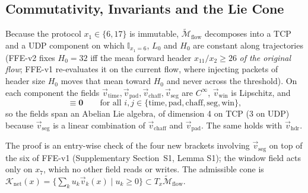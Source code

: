 \subsection{Commutativity, Invariants and the Lie Cone}
\label{sec:invariants}

\begin{proposition}
\label{prop:lie_commutativity}
Because the protocol $x_1\in\{6,17\}$ is immutable, $\widetilde{\mathcal{M}}_{\text{flow}}$ decomposes into a TCP and a UDP component on which $\mathbb{I}_{x_1=6}$, $L_0$ and $H_0$ are constant along trajectories (FFE-v2 fixes $H_0=32$ iff the mean forward header $x_{11}/x_2\ge26$ \emph{of the original flow}; FFE-v1 re-evaluates it on the current flow, where injecting packets of header size $H_0$ moves that mean toward $H_0$ and never across the threshold). On each component the fields $\vec v_{\text{time}},\vec v_{\text{pad}},\vec v_{\text{chaff}},\vec v_{\text{seg}}$ are $C^\infty$, $\vec v_{\text{win}}$ is Lipschitz, and
\begin{equation}
    [\vec v_i,\vec v_j]\equiv\mathbf{0}\qquad\text{for all }i,j\in\{\text{time},\text{pad},\text{chaff},\text{seg},\text{win}\},
\end{equation}
so the fields span an Abelian Lie algebra, of dimension 4 on TCP (3 on UDP) because $\vec v_{\text{seg}}$ is a linear combination of $\vec v_{\text{chaff}}$ and $\vec v_{\text{pad}}$. The same holds with $\vec v_{\text{hdr}}$.
\end{proposition}
The proof is an entry-wise check of the four new brackets involving $\vec v_{\text{seg}}$ on top of the six of FFE-v1 (Supplementary Section~S1, Lemma S1); the window field acts only on $x_7$, which no other field reads or writes. The admissible cone is $\mathcal{K}_{\text{net}}(x)=\{\sum_k u_k\vec v_k(x)\mid u_k\ge0\}\subset T_x\widetilde{\mathcal{M}}_{\text{flow}}$.

